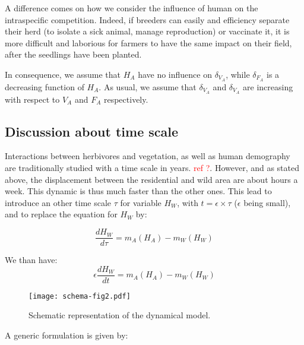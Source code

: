 \documentclass{article}
\newcommand{\lfw}{\lambda_{F}}
\newcommand{\lvw}{\lambda_{V}}
\newcommand{\marc}[1]{\textcolor{red}{#1}}
\begin{document}
A difference comes on how we consider the influence of human on the intraspecific competition. Indeed, if breeders can easily and efficiency separate their herd (to isolate a sick animal, manage reproduction) or vaccinate it, it is more difficult and laborious for farmers to have the same impact on their field, after the seedlings have been planted.

In consequence, we assume that $H_A$ have no influence on $\delta_{V_A}$, while $\delta_{F_A}$ is a decreasing function of $H_A$. As usual, we assume that $\delta_{V_A}$ and $\delta_{V_A}$ are increasing with respect to $V_A$ and $F_A$ respectively.


\subsection{Discussion about time scale}
Interactions between herbivores and vegetation, as well as human demography are traditionally studied with a time scale in years. \marc{ref ?}. However, and as stated above, the displacement between the residential and wild area are about hours a week. This dynamic is thus much faster than the other ones. This lead to introduce an other time scale $\tau$ for variable $H_W$, with $t = \epsilon \times \tau$ ($\epsilon$ being small), and to replace the equation for $H_W$ by:

\begin{equation*}
\dfrac{dH_W}{d\tau} = m_A(H_A) - m_W(H_W)
\end{equation*}


We than have:
\begin{equation*}
\epsilon \dfrac{dH_W}{dt} = m_A(H_A) - m_W(H_W)
\end{equation*}

\newpage

\begin{figure}[!ht]
\centering
\texttt{[image: schema-fig2.pdf]}
\caption{\centering Schematic representation of the dynamical model.}
\end{figure}

\newpage

A generic formulation is given by:

%
\end{document}
